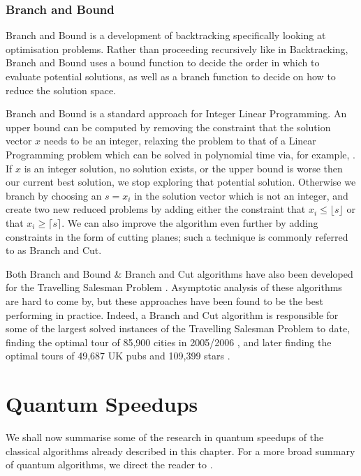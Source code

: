 \subsubsection{Branch and Bound}

Branch and Bound is a development of backtracking specifically looking at optimisation problems. Rather than proceeding recursively like in Backtracking, Branch and Bound uses a bound function to decide the order in which to evaluate potential solutions, as well as a branch function to decide on how to reduce the solution space.

Branch and Bound is a standard approach for Integer Linear Programming. An upper bound can be computed by removing the constraint that the solution vector $x$ needs to be an integer, relaxing the problem to that of a Linear Programming problem which can be solved in polynomial time via, for example, \cite{cohen2019}. If $x$ is an integer solution, no solution exists, or the upper bound is worse then our current best solution, we stop exploring that potential solution. Otherwise we branch by choosing an $s = x_i$ in the solution vector which is not an integer, and create two new reduced problems by adding either the constraint that $x_i \leq \lfloor s \rfloor$ or that $x_i \geq \lceil s \rceil$. We can also improve the algorithm even further by adding constraints in the form of cutting planes; such a technique is commonly referred to as Branch and Cut.

Both Branch and Bound \& Branch and Cut algorithms have also been developed for the Travelling Salesman Problem \cite{little1963, padberg1991}. Asymptotic analysis of these algorithms are hard to come by, but these approaches have been found to be the best performing in practice. Indeed, a Branch and Cut algorithm is responsible for some of the largest solved instances of the Travelling Salesman Problem to date, finding the optimal tour of 85,900 cities in 2005/2006 \cite{applegate2006}, and later finding the optimal tours of 49,687 UK pubs and 109,399 stars \cite{tspuk49687}.

\section{Quantum Speedups}

We shall now summarise some of the research in quantum speedups of the classical algorithms already described in this chapter. For a more broad summary of quantum algorithms, we direct the reader to \cite{montanaro2016}.

